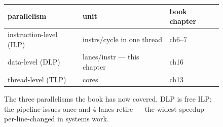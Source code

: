 \begin{figure}[htbp]
\centering
\begin{tabular}{lll}
\toprule
parallelism & unit & book chapter \\
\midrule
instruction-level (ILP) & instrs/cycle in one thread & ch6--7 \\
data-level (DLP) & lanes/instr --- this chapter & ch16 \\
thread-level (TLP) & cores & ch13 \\
\bottomrule
\end{tabular}
\caption{The three parallelisms the book has now covered. DLP is
free ILP: the pipeline issues once and 4 lanes retire --- the
widest speedup-per-line-changed in systems work.}
\label{fig:dlp16}
\end{figure}
